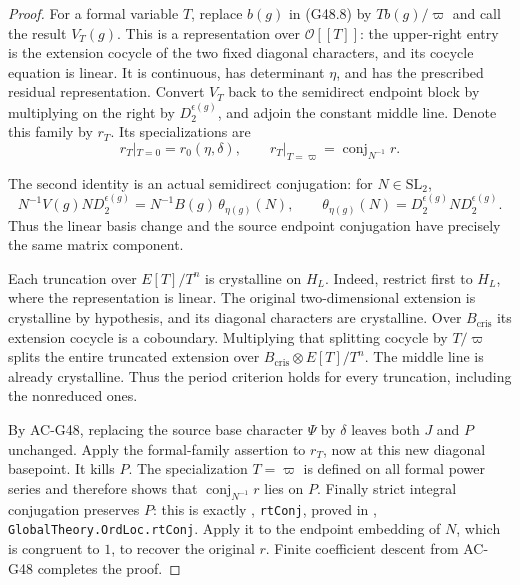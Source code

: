 \begin{proof}
For a formal variable $T$, replace $b(g)$ in (G48.8) by
$T b(g)/\varpi$ and call the result $V_T(g)$.
This is a representation over $\mathcal O[[T]]$:
the upper-right entry is the extension cocycle of the two
fixed diagonal characters, and its cocycle equation is
linear.  It is continuous, has determinant $\eta$, and
has the prescribed residual representation.
Convert $V_T$ back to the semidirect endpoint block by
multiplying on the right by $D_2^{\epsilon(g)}$, and
adjoin the constant middle line.  Denote this family by $r_T$.
Its specializations are
\[
 r_T|_{T=0}=r_0(\eta,\delta),\qquad
 r_T|_{T=\varpi}=\operatorname{conj}_{N^{-1}}r.       \tag{G48.9}
\]

The second identity is an actual semidirect conjugation:
for $N\in\mathrm{SL}_2$,
\[
 N^{-1}V(g)N D_2^{\epsilon(g)}
 =N^{-1}B(g)\,\theta_{\eta(g)}(N),
 \qquad \theta_{\eta(g)}(N)=D_2^{\epsilon(g)}ND_2^{\epsilon(g)}.
\]
Thus the linear basis change and the source endpoint
conjugation have precisely the same matrix component.

Each truncation over $E[T]/T^n$ is crystalline on $H_L$.
Indeed, restrict first to $H_L$, where the representation
is linear.  The original two-dimensional extension is
crystalline by hypothesis, and its diagonal characters are
crystalline.  Over $B_{\mathrm{cris}}$ its extension
cocycle is a coboundary.  Multiplying that splitting
cocycle by $T/\varpi$ splits the entire truncated extension
over $B_{\mathrm{cris}}\otimes E[T]/T^n$.
The middle line is already crystalline.  Thus the period
criterion holds for every truncation, including the
nonreduced ones.

By AC-G48, replacing the source base character $\Psi$ by
$\delta$ leaves both $J$ and $P$ unchanged.  Apply the
formal-family assertion to $r_T$, now at this new diagonal
basepoint.  It kills $P$.  The specialization $T=\varpi$
is defined on all formal power series and therefore shows
that $\operatorname{conj}_{N^{-1}}r$ lies on $P$.
Finally strict integral conjugation preserves $P$:
this is exactly
, \texttt{rtConj},
proved in
,
\texttt{GlobalTheory.OrdLoc.rtConj}.
Apply it to the endpoint embedding of $N$, which is
congruent to $1$, to recover the original $r$.
Finite coefficient descent from AC-G48 completes the proof.
\end{proof}

